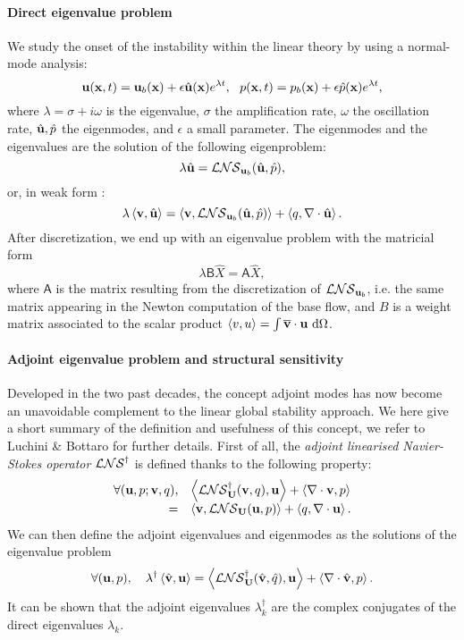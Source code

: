 \documentclass[twocolumn,10pt]{asme2ej}
\newcommand{\be}[1]{ \begin{equation} \label{#1}}
\newcommand{\ee}{\end{equation}}
\newcommand{\bes}[1]{ \begin{equation} \label{#1}\begin{array}{rl}}
\newcommand{\ees}{\end{array}\end{equation}}
\begin{document}
\paragraph{Direct eigenvalue problem}
We study the onset of the instability within the linear theory by using a normal-mode analysis:
\be{startmodepropre}
{\bf u} ({\bf{x}},t) = {\bf u}_b({\bf{x}}) + \epsilon \hat{\bf u}({\bf{x}}) e^{\lambda t}, \,\,\,\, {p}({\bf{x}},t) = {p}_b({\bf{x}}) + \epsilon \hat{p}({\bf{x}}) e^{\lambda t},
\ee
where $\lambda = \sigma + i \omega$ is the eigenvalue, $\sigma$ the amplification rate,
$\omega$ the oscillation rate, $\hat{{\bf u}},\hat{p}$ the eigenmodes, and $\epsilon$ a small parameter.
The eigenmodes and the eigenvalues are the solution of the following eigenproblem:
 \be{LEP}
\lambda \hat{{\bf u}} = {\cal LNS}_{{\bf u}_b}( \hat{\bf u},\hat{p}),
\ee
or, in weak form : 
\be{eigenvalueproblem}
\lambda \left< {\bf v} , \hat{{\bf u}} \right> = \left< {\bf v}, {\cal LNS}_{{\bf u}_b} ( \hat{\bf u},\hat{p})\right> + \left< q, \nabla \cdot \hat{\bf u} \right>.
\ee
After discretization, we end up with an eigenvalue problem with the matricial form
\be{Eigen_matricial}
\lambda {\mathsf{B}} \hat{X} = {\mathsf{A}} \hat{X},
\ee
where ${\mathsf{A}}$ is the matrix resulting from the discretization of ${\cal LNS}_{{\bf u}_b}$, i.e. the same matrix  appearing in the Newton computation of the base flow, and  $B$ is a weight matrix associated to the scalar product $\left<v,u\right> = \int \overline{\bf v} \cdot {\bf u} \mbox{ d} \Omega$.

\paragraph{Adjoint eigenvalue problem and structural sensitivity}
Developed in the two past decades, the concept adjoint modes has now become an unavoidable complement to the linear global stability approach. We here give a short summary of the definition and usefulness of this concept, 
we refer to Luchini \& Bottaro\cite{LucBott2014} for further details.
First of all, the {\em adjoint linearised Navier-Stokes operator} ${\cal LNS}^\dag$ is defined thanks to the following 
property:
\bes{NSLAdj}
\forall ( {\bf u}, p ; {\bf v}, q), & \left< {\cal LNS}^\dag_{\bf U}( {\bf v},q) ,{\bf u}\right> + \left< \nabla \cdot {\bf v},p\right>  \\
=& \left< {\bf v}, {\cal LNS}_{\bf U} ({\bf u},p)\right> + \left< q, \nabla \cdot {\bf u}\right>.
\ees
We can then define the adjoint eigenvalues and eigenmodes as the solutions of the eigenvalue problem 
\be{EigenAdj} 
\forall ( {\bf u}, p), \quad  \lambda^\dag \left< \hat{\bf v}, {\bf u}\right> =
 \left< {\cal LNS}^\dag_{\bf U}( \hat{\bf v},\hat{q}) ,{\bf u}\right> + \left< \nabla \cdot \hat{\bf v},p\right> . 
\ee
It can be shown \cite{SchmidHenningson2001} that the adjoint eigenvalues $\lambda^\dag_k$ are the complex conjugates of the direct eigenvalues $\lambda_k$. 
\end{document}
